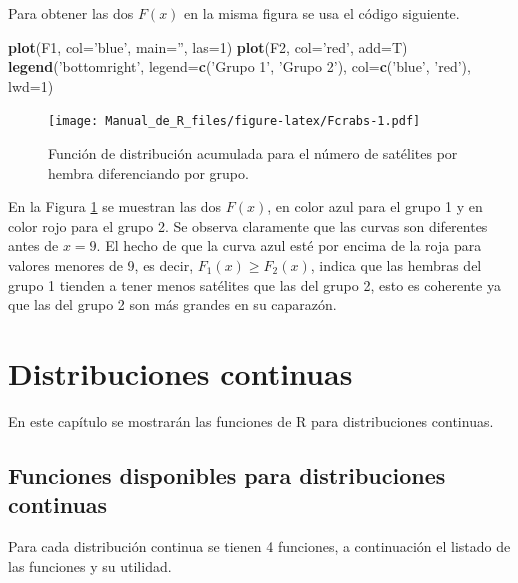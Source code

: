 \documentclass[10pt,]{krantz}
\makeatletter
\newenvironment{Shaded}{\begin{snugshade}}{\end{snugshade}}
\newcommand{\KeywordTok}[1]{\textcolor[rgb]{0.13,0.29,0.53}{\textbf{#1}}}
\newcommand{\DataTypeTok}[1]{\textcolor[rgb]{0.13,0.29,0.53}{#1}}
\newcommand{\DecValTok}[1]{\textcolor[rgb]{0.00,0.00,0.81}{#1}}
\newcommand{\StringTok}[1]{\textcolor[rgb]{0.31,0.60,0.02}{#1}}
\newcommand{\NormalTok}[1]{#1}
\newenvironment{kframe}{%
\medskip{}
\setlength{\fboxsep}{.8em}
 \def\at@end@of@kframe{}%
 \ifinner\ifhmode%
  \def\at@end@of@kframe{\end{minipage}}%
  \begin{minipage}{\columnwidth}%
 \fi\fi%
 \def\FrameCommand##1{\hskip\@totalleftmargin \hskip-\fboxsep
 \colorbox{shadecolor}{##1}\hskip-\fboxsep
     \hskip-\linewidth \hskip-\@totalleftmargin \hskip\columnwidth}%
 \MakeFramed {\advance\hsize-\width
   \@totalleftmargin\z@ \linewidth\hsize
   \@setminipage}}%
 {\par\unskip\endMakeFramed%
 \at@end@of@kframe}
\renewenvironment{Shaded}{\begin{kframe}}{\end{kframe}}
\makeatother
\begin{document}
Para obtener las dos \(F(x)\) en la misma figura se usa el código
siguiente.

\begin{Shaded}
\begin{Highlighting}[]
\KeywordTok{plot}\NormalTok{(F1, }\DataTypeTok{col=}\StringTok{'blue'}\NormalTok{, }\DataTypeTok{main=}\StringTok{''}\NormalTok{, }\DataTypeTok{las=}\DecValTok{1}\NormalTok{)}
\KeywordTok{plot}\NormalTok{(F2, }\DataTypeTok{col=}\StringTok{'red'}\NormalTok{, }\DataTypeTok{add=}\NormalTok{T)}
\KeywordTok{legend}\NormalTok{(}\StringTok{'bottomright'}\NormalTok{, }\DataTypeTok{legend=}\KeywordTok{c}\NormalTok{(}\StringTok{'Grupo 1'}\NormalTok{, }\StringTok{'Grupo 2'}\NormalTok{),}
       \DataTypeTok{col=}\KeywordTok{c}\NormalTok{(}\StringTok{'blue'}\NormalTok{, }\StringTok{'red'}\NormalTok{), }\DataTypeTok{lwd=}\DecValTok{1}\NormalTok{)}
\end{Highlighting}
\end{Shaded}

\begin{figure}
\centering
\texttt{[image: Manual\_de\_R\_files/figure-latex/Fcrabs-1.pdf]}
\caption{\label{fig:Fcrabs}Función de distribución acumulada para el número
de satélites por hembra diferenciando por grupo.}
\end{figure}

En la Figura \ref{fig:Fcrabs} se muestran las dos \(F(x)\), en color
azul para el grupo 1 y en color rojo para el grupo 2. Se observa
claramente que las curvas son diferentes antes de \(x=9\). El hecho de
que la curva azul esté por encima de la roja para valores menores de 9,
es decir, \(F_1(x) \geq F_2(x)\), indica que las hembras del grupo 1
tienden a tener menos satélites que las del grupo 2, esto es coherente
ya que las del grupo 2 son más grandes en su caparazón.

\chapter{Distribuciones continuas}\label{continuas}

En este capítulo se mostrarán las funciones de R para distribuciones
continuas.

\section{Funciones disponibles para distribuciones
continuas}\label{funciones-disponibles-para-distribuciones-continuas}

Para cada distribución continua se tienen 4 funciones, a continuación el
listado de las funciones y su utilidad.
\end{document}
